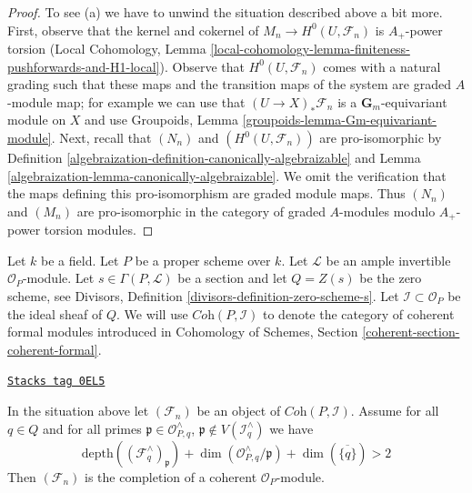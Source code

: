 \begin{proof}
\medskip\noindent
To see (a) we have to unwind the situation described above a bit more.
First, observe that the kernel and cokernel of $M_n \to H^0(U, \mathcal{F}_n)$
is $A_+$-power torsion (Local Cohomology, Lemma
\ref{local-cohomology-lemma-finiteness-pushforwards-and-H1-local}).
Observe that $H^0(U, \mathcal{F}_n)$ comes with a natural grading
such that these maps and the transition maps of the system are
graded $A$-module map; for example we can use that
$(U \to X)_*\mathcal{F}_n$ is a $\mathbf{G}_m$-equivariant module
on $X$ and use
Groupoids, Lemma \ref{groupoids-lemma-Gm-equivariant-module}.
Next, recall that $(N_n)$ and $(H^0(U, \mathcal{F}_n))$
are pro-isomorphic by Definition \ref{algebraization-definition-canonically-algebraizable}
and Lemma \ref{algebraization-lemma-canonically-algebraizable}.
We omit the verification that the maps defining this
pro-isomorphism are graded module maps.
Thus $(N_n)$ and $(M_n)$ are pro-isomorphic in the category of
graded $A$-modules modulo $A_+$-power torsion modules.
\end{proof}

Let $k$ be a field. Let $P$ be a proper scheme over $k$.
Let $\mathcal{L}$ be an ample invertible $\mathcal{O}_P$-module.
Let $s \in \Gamma(P, \mathcal{L})$ be a section and let
$Q = Z(s)$ be the zero scheme, see
Divisors, Definition \ref{divisors-definition-zero-scheme-s}.
Let $\mathcal{I} \subset \mathcal{O}_P$ be the ideal sheaf of $Q$.
We will use $\textit{Coh}(P, \mathcal{I})$ to denote the category
of coherent formal modules introduced in
Cohomology of Schemes, Section \ref{coherent-section-coherent-formal}.

\begin{proposition}
\label{algebraization-proposition-lefschetz-existence}
\href{https://stacks.math.columbia.edu/tag/0EL5}{\texttt{Stacks tag 0EL5}}

In the situation above let $(\mathcal{F}_n)$ be an object of
$\textit{Coh}(P, \mathcal{I})$. Assume for all $q \in Q$ and for
all primes $\mathfrak p \in \mathcal{O}_{P, q}^\wedge$,
$\mathfrak p \not \in V(\mathcal{I}_q^\wedge)$ we have
$$
\text{depth}((\mathcal{F}_q^\wedge)_\mathfrak p) +
\dim(\mathcal{O}_{P, q}^\wedge/\mathfrak p) +
\dim(\overline{\{q\}}) > 2
$$
Then $(\mathcal{F}_n)$ is the completion of a coherent
$\mathcal{O}_P$-module.
\end{proposition}

